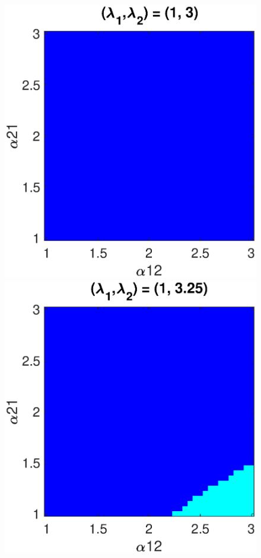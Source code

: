 \begin{figure}[h]
\centering
  \begin{minipage}{0.32\linewidth}
  \begin{center}
\includegraphics[width=1\linewidth]{Images/photo24_1.eps}
\end{center}
  \end{minipage} 
  \begin{minipage}{0.32\linewidth}
  \begin{center}
\includegraphics[width=1\linewidth]{Images/photo24_2.eps}
\end{center}


\end{minipage}
\end{figure}
